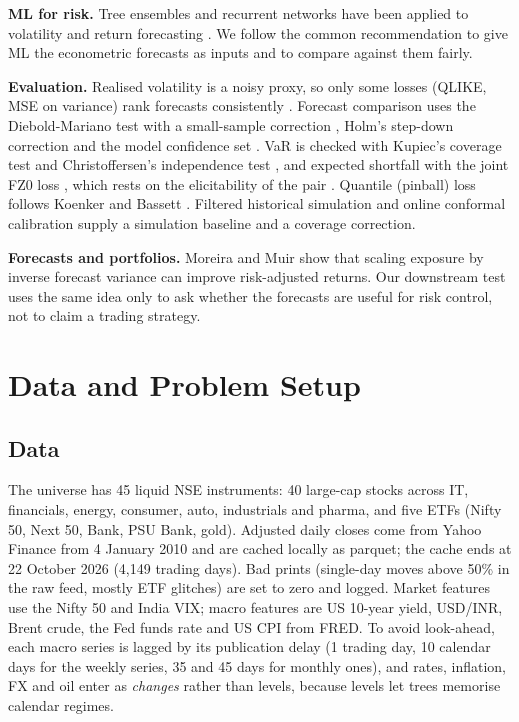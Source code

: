 \documentclass[conference,a4paper]{IEEEtran}
\begin{document}
\textbf{ML for risk.} Tree ensembles \cite{breiman2001,chen2016} and recurrent networks
\cite{hochreiter1997} have been applied to volatility and return forecasting
\cite{christensen2023,gu2020}. We follow the common recommendation to give ML the econometric
forecasts as inputs and to compare against them fairly.

\textbf{Evaluation.} Realised volatility is a noisy proxy, so only some losses (QLIKE, MSE on
variance) rank forecasts consistently \cite{patton2011}. Forecast comparison uses the
Diebold-Mariano test \cite{dm1995} with a small-sample correction \cite{hln1997}, Holm's
step-down correction \cite{holm1979} and the model confidence set \cite{hansen2011}. VaR is checked
with Kupiec's coverage test \cite{kupiec1995} and Christoffersen's independence test
\cite{christoffersen1998}, and expected shortfall with the joint FZ0 loss \cite{patton2019}, which rests on the elicitability
of the pair \cite{fissler2016}.
Quantile (pinball) loss follows Koenker and Bassett \cite{koenker1978}. Filtered historical
simulation \cite{barone1999} and online conformal calibration \cite{gibbs2021} supply a simulation
baseline and a coverage correction.

\textbf{Forecasts and portfolios.} Moreira and Muir \cite{moreira2017} show that scaling exposure
by inverse forecast variance can improve risk-adjusted returns. Our downstream test uses the same
idea only to ask whether the forecasts are useful for risk control, not to claim a trading strategy.

\section{Data and Problem Setup}
\subsection{Data}
The universe has 45 liquid NSE instruments: 40 large-cap stocks across IT, financials, energy,
consumer, auto, industrials and pharma, and five ETFs (Nifty 50, Next 50, Bank, PSU Bank, gold).
Adjusted daily closes come from Yahoo Finance from 4 January 2010 and are cached locally as
parquet; the cache ends at 22 October 2026 (4,149 trading days). Bad prints (single-day moves
above 50\% in the raw feed, mostly ETF glitches) are set to zero and logged. Market features use
the Nifty 50 and India VIX; macro features are US 10-year yield, USD/INR, Brent crude, the Fed funds
rate and US CPI from FRED. To avoid look-ahead, each macro series is lagged by its publication
delay (1 trading day, 10 calendar days for the weekly series, 35 and 45 days for monthly ones), and
rates, inflation, FX and oil enter as \emph{changes} rather than levels, because levels let trees
memorise calendar regimes.
\end{document}
